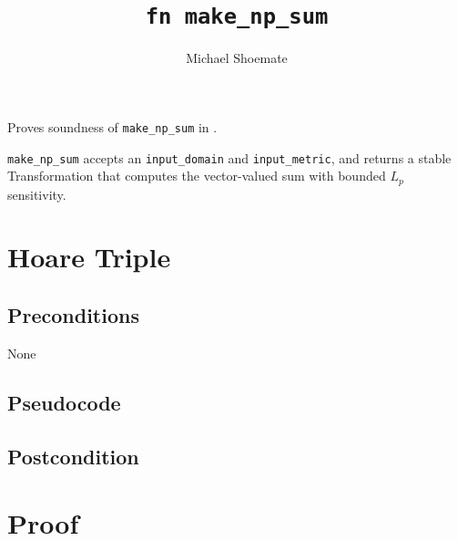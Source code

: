 \documentclass{article}
\title{\texttt{fn make\_np\_sum}}
\author{Michael Shoemate}
\begin{document}
\maketitle

\contrib

Proves soundness of \texttt{make\_np\_sum} in .

\texttt{make\_np\_sum} accepts an \texttt{input\_domain} and \texttt{input\_metric},
and returns a stable Transformation that computes the vector-valued sum with bounded $L_p$ sensitivity.

\section{Hoare Triple}

\subsection*{Preconditions}
None

\subsection*{Pseudocode}


\subsection*{Postcondition}


\section{Proof}
\end{document}
